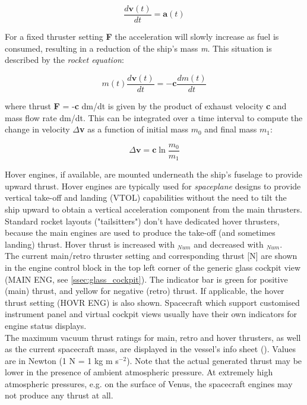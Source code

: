 \documentclass[Orbiter User Manual.tex]{subfiles}
\begin{document}
\[ \frac{d\textbf{v}(t)}{dt} = \textbf{a}(t) \]

\noindent
For a fixed thruster setting \textbf{F} the acceleration will slowly increase as fuel is consumed, resulting in a reduction of the ship's mass \textit{m}. This situation is described by the \textit{rocket equation}:

\[ m(t) \frac{d\textbf{v}(t)}{dt} = - \textbf{c} \frac{dm(t)}{dt} \]

\noindent
where thrust \textbf{F} = -\textbf{c} dm/dt is given by the product of exhaust velocity \textbf{c} and mass flow rate dm/dt. This can be integrated over a time interval to compute the change in velocity $\Delta$\textbf{v} as a function of initial mass $m_{0}$ and final mass $m_{1}$:


\[ \Delta \textbf{v} = \textbf{c} \ln \frac{m_{0}}{m_{1}} \]

\noindent
Hover engines, if available, are mounted underneath the ship's fuselage to provide upward thrust. Hover engines are typically used for \textit{spaceplane} designs to provide vertical take-off and landing (VTOL) capabilities without the need to tilt the ship upward to obtain a vertical acceleration component from the main thrusters. Standard rocket layouts ("tailsitters") don't have dedicated hover thrusters, because the main engines are used to produce the take-off (and sometimes landing) thrust. Hover thrust is increased with $_{Num}$ and decreased with $_{Num}$.\\
The current main/retro thruster setting and corresponding thrust [N] are shown in the engine control block in the top left corner of the generic glass cockpit view (MAIN ENG, see \ref{ssec:glass_cockpit}). The indicator bar is green for positive (main) thrust, and yellow for negative (retro) thrust. If applicable, the hover thrust setting (HOVR ENG) is also shown. Spacecraft which support customised instrument panel and virtual cockpit views usually have their own indicators for engine status displays.\\
The maximum vacuum thrust ratings for main, retro and hover thrusters, as well as the current spacecraft mass, are displayed in the vessel's info sheet (\Ctrl{}). Values are in Newton (1 N = 1 kg m s$^{-2}$). Note that the actual generated thrust may be lower in the presence of ambient atmospheric pressure. At extremely high atmospheric pressures, e.g. on the surface of Venus, the spacecraft engines may not produce any thrust at all.
\end{document}

